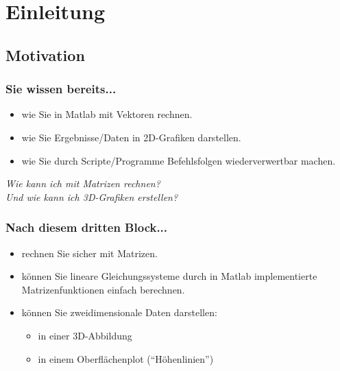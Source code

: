 



\setcounter{mchapter}{3}
\setcounter{mexercise}{0}


  

    \section{Einleitung}

    \subsection{Motivation}
    \begin{frame}
        \frametitle{Sie wissen bereits...}
        \begin{itemize}
            \item wie Sie in Matlab mit Vektoren rechnen.
            \item wie Sie Ergebnisse/Daten in 2D-Grafiken darstellen.
            \item wie Sie durch Scripte/Programme Befehlsfolgen wiederverwertbar machen.
        \end{itemize}

        \textit{Wie kann ich mit Matrizen rechnen?} \\
        \textit{Und wie kann ich 3D-Grafiken erstellen?}
    \end{frame}

    \begin{frame}
        \frametitle{Nach diesem dritten Block...}
        \begin{itemize}
            \item rechnen Sie sicher mit Matrizen.
            \item können Sie lineare Gleichungssysteme durch in Matlab implementierte Matrizenfunktionen einfach berechnen.
            \item können Sie zweidimensionale Daten darstellen:
            \begin{itemize}
                \item in einer 3D-Abbildung
                \item in einem Oberflächenplot (``Höhenlinien'')
            \end{itemize}
        \end{itemize}
    \end{frame}

